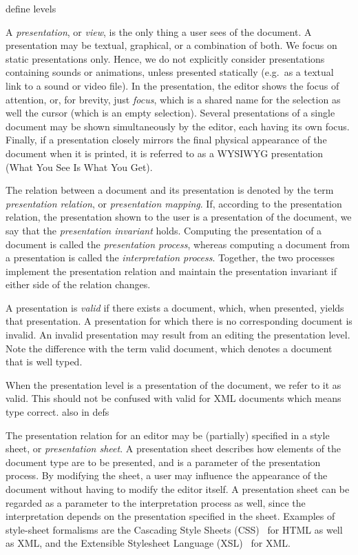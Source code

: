 \bc define levels \ec

A {\em presentation}, or {\em view}, is the only thing a user sees of the document. A presentation may be textual, graphical, or a combination of both. We focus on static presentations only. Hence, we do not explicitly consider presentations containing sounds or animations, unless presented statically (e.g.\ as a textual link to a sound or video file). In the presentation, the editor shows the focus of attention, or, for brevity, just {\em focus}, which is a shared name for the selection as well the cursor (which is an empty selection).  Several presentations of a single document may be shown simultaneously by the editor, each having its own focus. Finally, if a presentation closely mirrors the final physical appearance of the document when it is printed, it is referred to as a WYSIWYG presentation (What You See Is What You Get).

The relation between a document and its presentation is denoted by the term {\em presentation relation}, or {\em presentation mapping}. If, according to the presentation relation, the presentation shown to the user is a presentation of the document, we say that the {\em presentation invariant} holds. Computing the presentation of a document is called the {\em presentation process}, whereas computing a document from a presentation is called the {\em interpretation process}. Together, the two processes implement the presentation relation and maintain the presentation invariant if either side of the relation changes.

A presentation is {\em valid} if there exists a document, which, when presented, yields that presentation. A presentation for which there is no corresponding document is invalid. An invalid presentation may result from an editing the presentation level. Note the difference with the term valid document, which denotes a document that is well typed.

\bc
When the presentation level is a presentation of the document, we refer to it as valid. This should not be confused with valid for XML documents which means type correct.
also in defs
\ec

The presentation relation for an editor may be (partially) specified in a style sheet, or {\em presentation sheet}. A presentation sheet describes how elements of the document type are to be presented, and is a parameter of the presentation process. By modifying the sheet, a user may influence the appearance of the document without having to modify the editor itself. A presentation sheet can be regarded as a parameter to the interpretation process as well, since the interpretation depends on the presentation specified in the sheet. Examples of style-sheet formalisms are the Cascading Style Sheets (CSS)~\cite{css2} for HTML as well as XML, and the Extensible Stylesheet Language (XSL)~\cite{xsl10} for XML.


